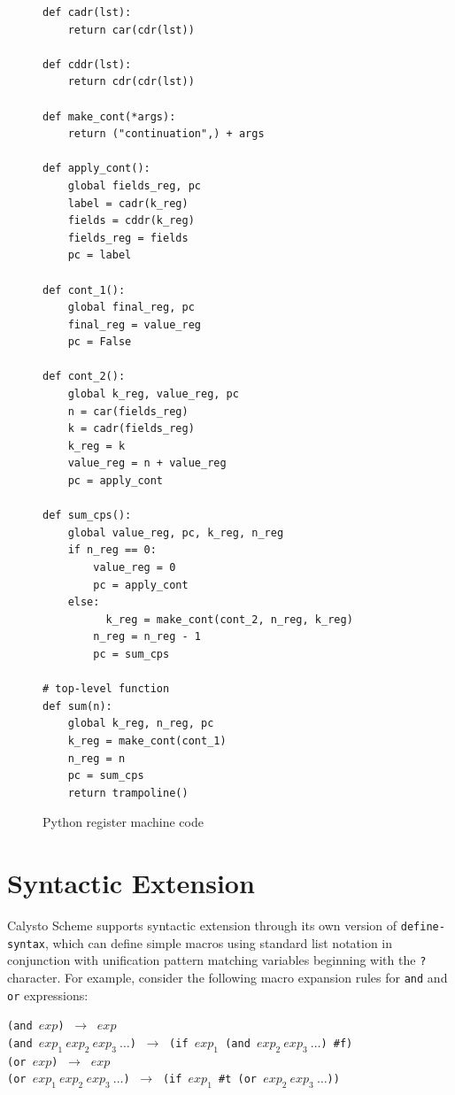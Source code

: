 \documentclass[acmsmall,screen,anonymous,review]{acmart}
\begin{document}
\begin{figure}[h]
\begin{minipage}{0.4\textwidth}
{\begin{verbatim}
def cadr(lst):
    return car(cdr(lst))

def cddr(lst):
    return cdr(cdr(lst))

def make_cont(*args):
    return ("continuation",) + args

def apply_cont():
    global fields_reg, pc
    label = cadr(k_reg)
    fields = cddr(k_reg)
    fields_reg = fields
    pc = label

def cont_1():
    global final_reg, pc
    final_reg = value_reg
    pc = False

def cont_2():
    global k_reg, value_reg, pc
    n = car(fields_reg)
    k = cadr(fields_reg)
    k_reg = k
    value_reg = n + value_reg
    pc = apply_cont

def sum_cps():
    global value_reg, pc, k_reg, n_reg
    if n_reg == 0:
        value_reg = 0
        pc = apply_cont
    else:
          k_reg = make_cont(cont_2, n_reg, k_reg)
        n_reg = n_reg - 1
        pc = sum_cps

# top-level function
def sum(n):
    global k_reg, n_reg, pc
    k_reg = make_cont(cont_1)
    n_reg = n
    pc = sum_cps
    return trampoline()
\end{verbatim}
}
\caption{Python register machine code}
\label{fig:pythonRM}
\end{minipage}
\end{figure}


\section{Syntactic Extension}

\noindent
Calysto Scheme supports syntactic extension through its own version of
\texttt{define-syntax}, which can define simple macros using standard list
notation in conjunction with unification pattern matching variables beginning
with the \texttt{?} character.  For example, consider the following macro
expansion rules for \texttt{and} and \texttt{or} expressions:\\

\begin{minipage}{\textwidth}
\texttt{(and $\mathit{exp}$)} $~\rightarrow~$ $\mathit{exp}$\\
\texttt{(and $\mathit{exp}_1~\mathit{exp}_2~\mathit{exp}_3~\ldots$)} $~\rightarrow~$
\texttt{(if $\mathit{exp}_1$ (and $\mathit{exp}_2~\mathit{exp}_3~\ldots$) \#f)}\\

\texttt{(or $\mathit{exp}$)} $~\rightarrow~$ $\mathit{exp}$\\
\texttt{(or $\mathit{exp}_1~\mathit{exp}_2~\mathit{exp}_3~\ldots$)} $~\rightarrow~$
\texttt{(if $\mathit{exp}_1$ \#t (or $\mathit{exp}_2~\mathit{exp}_3~\ldots$))}\\
\end{minipage}
\end{document}
